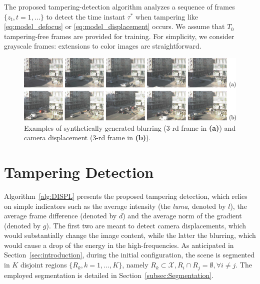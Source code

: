 \documentclass{llncs}
\begin{document}
The proposed tampering-detection algorithm analyzes a sequence of frames $\{z_t, t=1,\dots\}$ to detect the time instant $\tau^*$ when tampering like \eqref{eq:model_defocus} or \eqref{eq:model_displacement} occurs. We assume that $T_0$ tampering-free frames are provided for training. For simplicity, we consider grayscale frames: extensions to color images are straightforward.

\begin{figure}[t]
\centering
\includegraphics[width=1\linewidth]{Immagini/sequenze}
\caption{Examples of synthetically generated blurring (3-rd frame in \textbf{(a)}) and camera displacement (3-rd frame in \textbf{(b)}).}
\label{fig:sequences}
\end{figure}

\section{Tampering Detection}\label{sec:propSol}

Algorithm~\ref{alg:DISPL} presents the proposed tampering detection, which relies on simple indicators such as the average intensity (the \emph{luma}, denoted by $l$), the average frame difference (denoted by $d$) and the average norm of the gradient (denoted by $g$). The first two are meant to detect camera displacements, which would substantially change the image content, while the latter the blurring, which would cause a drop of the energy in the high-frequencies. As anticipated in Section~\ref{sec:introduction}, during the initial configuration, the scene is segmented in $K$ disjoint regions $\{R_k, k = 1,\dots,K\}$, namely $R_k \subset \mathcal{X}, R_i \cap R_j = \emptyset, \forall i \neq j$. The employed segmentation is detailed in Section~\ref{subsec:Segmentation}. 
\end{document}

